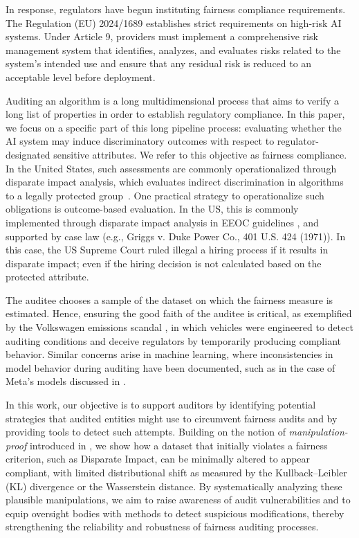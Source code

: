 \documentclass[runningheads, orivec]{llncs}
\begin{document}
In response, regulators have begun instituting fairness compliance requirements. The Regulation (EU) 2024/1689 establishes strict requirements on high-risk AI systems. Under Article 9, providers must implement a comprehensive risk management system that identifies, analyzes, and evaluates risks related to the system’s intended use and ensure that any residual risk is reduced to an acceptable level before deployment. 

Auditing an algorithm is a long multidimensional process that aims to verify a long list of properties in order to establish regulatory compliance. In this paper, we focus on a specific part of this long pipeline process: evaluating whether the AI system may induce discriminatory outcomes with respect to regulator-designated sensitive attributes. We refer to this objective as fairness compliance. In the United States, such assessments are commonly operationalized through disparate impact analysis, which evaluates indirect discrimination in algorithms to a legally protected group~\cite{feldman2015certifying}. One practical strategy to operationalize such obligations is outcome-based evaluation. In the US, this is commonly implemented through disparate impact analysis in EEOC guidelines \cite{Uni_guidelines}, and supported by case law (e.g., Griggs v. Duke Power Co., 401 U.S. 424 (1971)). In this case, the US Supreme Court ruled illegal a hiring process if it results in disparate impact; even if the hiring decision is not calculated based on the protected attribute.

The auditee chooses a sample of the dataset on which the fairness measure is estimated. Hence, ensuring the good faith of the auditee is critical, as exemplified by the Volkswagen emissions scandal \cite{Volkswagen}, in which vehicles were engineered to detect auditing conditions and deceive regulators by temporarily producing compliant behavior. Similar concerns arise in machine learning, where inconsistencies in model behavior during auditing have been documented, such as in the case of Meta's models discussed in \cite{bourree2025robustmlauditingusing}. 

In this work, our objective is to support auditors by identifying potential strategies that audited entities might use to circumvent fairness audits and by providing tools to detect such attempts. Building on the notion of \textit{manipulation-proof} introduced in \cite{pmlr-v162-yan22c}, we show how a dataset that initially violates a fairness criterion, such as Disparate Impact, can be minimally altered to appear compliant, with limited distributional shift as measured by the Kullback–Leibler (KL) divergence or the Wasserstein distance. By systematically analyzing these plausible manipulations, we aim to raise awareness of audit vulnerabilities and to equip oversight bodies with methods to detect suspicious modifications, thereby strengthening the reliability and robustness of fairness auditing processes.
\end{document}
